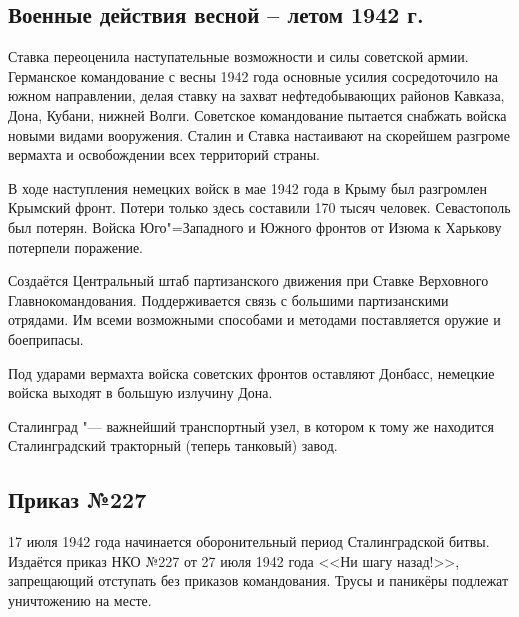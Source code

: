 \subsection{Военные действия весной -- летом 1942 г.}

Ставка переоценила наступательные возможности и силы советской армии. Германское командование с весны 1942 года основные усилия сосредоточило на южном направлении, делая ставку на захват нефтедобывающих районов Кавказа, Дона, Кубани, нижней Волги. Советское командование пытается снабжать войска новыми видами вооружения. Сталин и Ставка настаивают на скорейшем разгроме вермахта и освобождении всех территорий страны.

В ходе наступления немецких войск в мае 1942 года в Крыму был разгромлен Крымский фронт. Потери только здесь составили 170 тысяч человек. Севастополь был потерян. Войска Юго"=Западного и Южного фронтов от Изюма к Харькову потерпели поражение.

Создаётся Центральный штаб партизанского движения при Ставке Верховного Главнокомандования. Поддерживается связь с большими партизанскими отрядами. Им всеми возможными способами и методами поставляется оружие и боеприпасы.

Под ударами вермахта войска советских фронтов оставляют Донбасс, немецкие войска выходят в большую излучину Дона.

Сталинград "--- важнейший транспортный узел, в котором к тому же находится Сталинградский тракторный (теперь танковый) завод.

\subsection{Приказ №227}

17 июля 1942 года начинается оборонительный период Сталинградской битвы. Издаётся приказ НКО №227 от 27 июля 1942 года <<Ни шагу назад!>>, запрещающий отступать без приказов командования. Трусы и паникёры подлежат уничтожению на месте.
